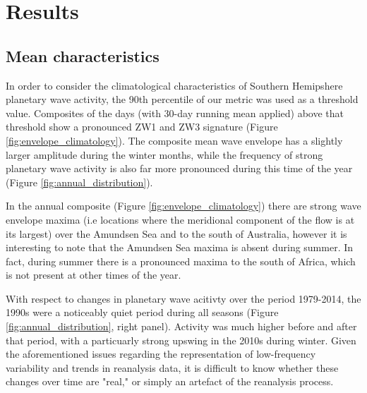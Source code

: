 \section{Results}

\subsection{Mean characteristics}

In order to consider the climatological characteristics of Southern Hemipshere planetary wave activity, the 90th percentile of our metric was used as a threshold value. Composites of the days (with 30-day running mean applied) above that threshold show a pronounced ZW1 and ZW3 signature (Figure \ref{fig:envelope_climatology}). The composite mean wave envelope has a slightly larger amplitude during the winter months, while the frequency of strong planetary wave activity is also far more pronounced during this time of the year (Figure \ref{fig:annual_distribution}).

In the annual composite (Figure \ref{fig:envelope_climatology}) there are strong wave envelope maxima (i.e locations where the meridional component of the flow is at its largest) over the Amundsen Sea and to the south of Australia, however it is interesting to note that the Amundsen Sea maxima is absent during summer. In fact, during summer there is a pronounced maxima to the south of Africa, which is not present at other times of the year.

With respect to changes in planetary wave acitivty over the period 1979-2014, the 1990s were a noticeably quiet period during all seasons (Figure \ref{fig:annual_distribution}, right panel). Activity was much higher before and after that period, with a particuarly strong upswing in the 2010s during winter. Given the aforementioned issues regarding the representation of low-frequency variability and trends in reanalysis data, it is difficult to know whether these changes over time are "real," or simply an artefact of the reanalysis process.




